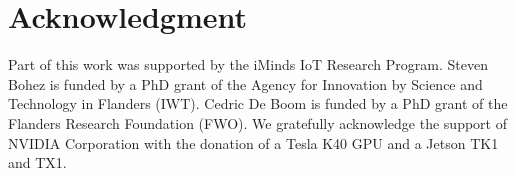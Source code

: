 \documentclass{article}
\begin{document}
\section*{Acknowledgment}
Part of this work was supported by the iMinds IoT Research Program. Steven Bohez is funded by a PhD grant of the Agency for Innovation by Science
and Technology in Flanders (IWT). Cedric De Boom is funded by a PhD grant of the Flanders Research Foundation (FWO). We gratefully acknowledge the support of NVIDIA Corporation with the donation of a Tesla K40 GPU and  a Jetson TK1 and TX1.

\clearpage


\end{document}
